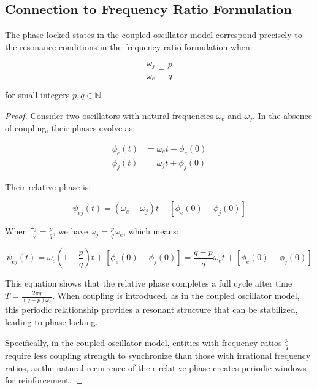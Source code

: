 \subsection{Connection to Frequency Ratio Formulation}

\begin{theorem}
The phase-locked states in the coupled oscillator model correspond precisely to the resonance conditions in the frequency ratio formulation when:

\begin{equation}
\frac{\omega_j}{\omega_e} = \frac{p}{q}
\end{equation}

for small integers $p, q \in \mathbb{N}$.
\end{theorem}

\begin{proof}
Consider two oscillators with natural frequencies $\omega_e$ and $\omega_j$. In the absence of coupling, their phases evolve as:

\begin{align}
\phi_e(t) &= \omega_e t + \phi_e(0) \\
\phi_j(t) &= \omega_j t + \phi_j(0)
\end{align}

Their relative phase is:

\begin{equation}
\psi_{ej}(t) = (\omega_e - \omega_j)t + [\phi_e(0) - \phi_j(0)]
\end{equation}

When $\frac{\omega_j}{\omega_e} = \frac{p}{q}$, we have $\omega_j = \frac{p}{q}\omega_e$, which means:

\begin{equation}
\psi_{ej}(t) = \omega_e(1 - \frac{p}{q})t + [\phi_e(0) - \phi_j(0)] = \frac{q-p}{q}\omega_e t + [\phi_e(0) - \phi_j(0)]
\end{equation}

This equation shows that the relative phase completes a full cycle after time $T = \frac{2\pi q}{(q-p)\omega_e}$. When coupling is introduced, as in the coupled oscillator model, this periodic relationship provides a resonant structure that can be stabilized, leading to phase locking.

Specifically, in the coupled oscillator model, entities with frequency ratios $\frac{p}{q}$ require less coupling strength to synchronize than those with irrational frequency ratios, as the natural recurrence of their relative phase creates periodic windows for reinforcement.
\end{proof}


